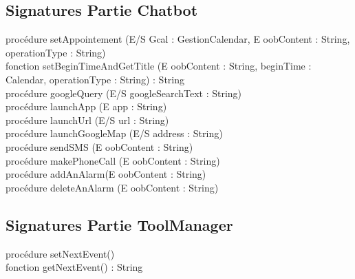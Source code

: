 \subsection{Signatures Partie Chatbot}
procédure setAppointement (E/S Gcal : GestionCalendar, E oobContent : String, operationType : String)\\
\indent fonction setBeginTimeAndGetTitle (E oobContent : String, beginTime : Calendar, operationType : String) : String\\
\indent procédure googleQuery (E/S googleSearchText : String)\\
\indent procédure launchApp (E app : String)\\
\indent procédure launchUrl (E/S url : String)\\
\indent procédure launchGoogleMap (E/S address : String)\\
\indent procédure sendSMS (E oobContent : String)\\
\indent procédure makePhoneCall (E oobContent : String)\\
\indent procédure addAnAlarm(E oobContent : String)\\
\indent procédure deleteAnAlarm (E oobContent : String)\\

\subsection{Signatures Partie ToolManager}
procédure setNextEvent()\\
\indent fonction getNextEvent() : String\\
\newpage

